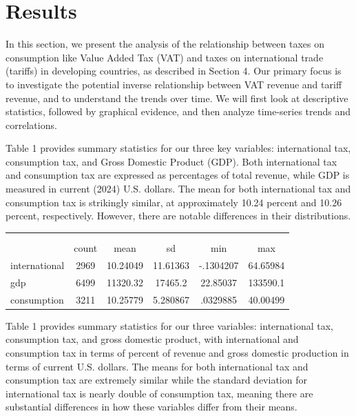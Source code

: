 \documentclass[12pt]{article}
\begin{document}
\section{Results}
\label{sec:result}

In this section, we present the analysis of the relationship between taxes on consumption like Value Added Tax (VAT) and taxes on international trade (tariffs) in developing countries, as described in Section 4. Our primary focus is to investigate the potential inverse relationship between VAT revenue and tariff revenue, and to understand the trends over time. We will first look at descriptive statistics, followed by graphical evidence, and then analyze time-series trends and correlations. 

Table 1 provides summary statistics for our three key variables: international tax, consumption tax, and Gross Domestic Product (GDP). Both international tax and consumption tax are expressed as percentages of total revenue, while GDP is measured in current (2024) U.S. dollars. The mean for both international tax and consumption tax is strikingly similar, at approximately 10.24 percent and 10.26 percent, respectively. However, there are notable differences in their distributions.

{
\def\sym#1{\ifmmode^{#1}\else\(^{#1}\)\fi}
\begin{tabular}{l*{1}{ccccc}}
            &\multicolumn{5}{c}{}                                         \\
            &\multicolumn{5}{c}{}                                            \\
            &       count&        mean&          sd&         min&         max\\
\hline
international&        2969&    10.24049&    11.61363&   -.1304207&    64.65984\\
gdp         &        6499&    11320.32&     17465.2&    22.85037&    133590.1\\
consumption &        3211&    10.25779&    5.280867&    .0329885&    40.00499\\
\hline
\end{tabular}
}

Table 1 provides summary statistics for our three variables: international tax, consumption tax, and gross domestic product, with international and consumption tax in terms of percent of revenue and gross domestic production in terms of current U.S. dollars. The means for both international tax and consumption tax are extremely similar while the standard deviation for international tax is nearly double of consumption tax, meaning there are substantial differences in how these variables differ from their means.
\end{document}
